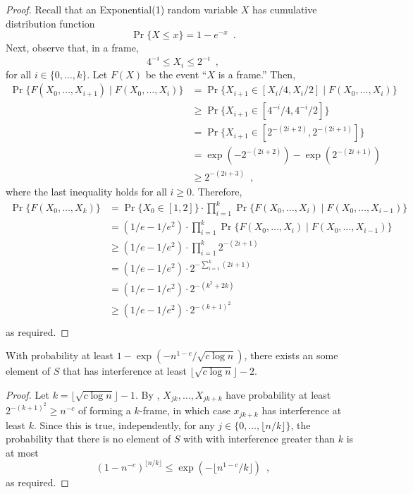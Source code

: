\documentclass{patmorin}
\begin{document}
\begin{proof}
Recall that an Exponential(1) random variable $X$ has cumulative
distribution function
\[
   \Pr\{X \le x\} = 1-e^{-x} \enspace .
\]
Next, observe that, in a frame,
\[
                 4^{-i} \le X_i \le 2^{-i}  \enspace ,
\]
for all $i\in\{0,\ldots,k\}$.  Let $F(X)$ be the event ``$X$ is a frame.''
Then,
\begin{align*}
     \Pr\{F(X_0,\ldots,X_{i+1}) \mid F(X_0,\ldots,X_{i})\} 
        & = \Pr\{X_{i+1} \in [X_{i}/4,X_{i}/2] \mid F(X_0,\ldots,X_{i})\} \\
        & \ge \Pr\{X_{i+1} \in [4^{-i}/4,4^{-i}/2]\} \\
        & = \Pr\{X_{i+1} \in [2^{-(2i+2)},2^{-(2i+1)}]\} \\
        & = \exp(-2^{-(2i+2)}) - \exp(2^{-(2i+1)}) \\
        & \ge 2^{-(2i+3)} \enspace ,
\end{align*}
where the last inequality holds for all $i\ge 0$.  Therefore,
\begin{align*}
     \Pr\{F(X_0,\ldots,X_{k})\}
   & = \Pr\{X_0\in[1,2]\}
         \cdot\prod_{i=1}^k \Pr\{F(X_0,\ldots,X_{i})
                                 \mid F(X_0,\ldots,X_{i-1})\} \\
   & = (1/e-1/e^2)
         \cdot\prod_{i=1}^k \Pr\{F(X_0,\ldots,X_{i})
                                 \mid F(X_0,\ldots,X_{i-1})\} \\
   & \ge (1/e-1/e^2)\cdot\prod_{i=1}^k 2^{-(2i+1)} \\
   & = (1/e-1/e^2)\cdot2^{-\sum_{i=1}^k(2i+1)} \\
   & = (1/e-1/e^2)\cdot2^{-(k^2+2k)} \\
   & \ge (1/e-1/e^2)\cdot2^{-(k+1)^2} \\
\end{align*}
as required.
\end{proof}


\begin{lem}
With probability at least $1-\exp(-n^{1-c}/\sqrt{c\log n})$, there exists
an some element of $S$ that has interference at least $\lfloor\sqrt{c\log
n}\rfloor-2$.
\end{lem}

\begin{proof}
Let $k=\lfloor \sqrt{c\log n} \rfloor-1$.  By ,
$X_{jk},\ldots,X_{jk+k}$ have probability at least $2^{-(k+1)^2}\ge
n^{-c}$ of forming a $k$-frame, in which case $x_{jk+k}$ has
interference at least $k$.  Since this is true, independently, for any
$j\in\{0,\ldots,\lfloor n/k\rfloor\}$, the probability that there is no
element of $S$ with with interference greater than $k$ is at most
\[
   (1-n^{-c})^{\lfloor n/k\rfloor} \le \exp(-\lfloor n^{1-c}/k\rfloor) \enspace ,
\]
as required.
\end{proof}
\end{document}
